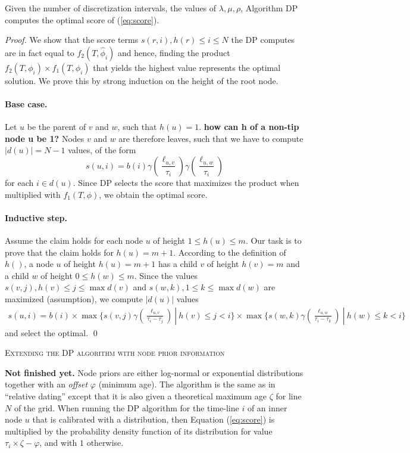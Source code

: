 \documentclass{llncs}
\renewcommand{\section}[1]{%
\bigskip
\begin{center}
\begin{Large}
\normalfont\scshape #1
\medskip
\end{Large}
\end{center}}
\begin{document}
\begin{theorem}[Optimality of DP]
Given the number of discretization intervals, the values of $\lambda,\mu,\rho$,
Algorithm DP computes the optimal score of (\ref{eq:score}).
\end{theorem}
\begin{proof}
We show that the score terms $s(r,i), h(r) \leq i \leq N$ the DP computes are
in fact equal to $f_2(T,\hat\phi_i)$ and hence, finding the product
$f_2(T,\phi_i)\times f_1(T,\phi_i)$ that yields the highest value represents the
optimal solution. We prove this by strong induction on the height of the
root node.
\paragraph{Base case.} Let $u$ be the parent of $v$ and $w$, such that $h(u) =
1$. {\bf how can h of a non-tip node u be 1?} 
Nodes $v$ and $w$ 
are therefore leaves, such that we have to compute
$|d(u)|=N-1$ values, of the form
%
%
$$
s(u,i) = b(i)
         \gamma(\frac{\ell_{u,v}}{\tau_i})
         \gamma(\frac{\ell_{u,w}}{\tau_i})
$$
%
%
for each $i \in d(u)$. Since DP selects the score that maximizes the product
when multiplied with $f_1(T,\phi)$, we obtain the optimal score.
\paragraph{Inductive step.} Assume the claim holds for each node $u$ of height
$1 \leq h(u) \leq m$. Our task is to prove that the claim holds for $h(u) =
m+1$.  According to the definition of $h()$, a node $u$ of height $h(u)=m+1$
has a child $v$ of height $h(v)=m$ and a child $w$ of height $0 \leq h(w) \leq
m$.  Since the values $s(v,j), h(v) \leq j \leq \max d(v)$ and $s(w,k), 1 \leq
k \leq \max d(w)$ are maximized (assumption), we compute $|d(u)|$ values
%
%
\begin{equation*}
\begin{split}
s(u,i) =  b(i)\times 
          \max\{ s(v,j)\gamma(\frac{\ell_{u,v}}{\tau_i-\tau_j})\ |\
              h(v) \leq j < i\} \times 
          \max\{ s(w,k)\gamma(\frac{\ell_{u,w}}{\tau_i-\tau_k})\ |\ 
               h(w) \leq k < i\}
\end{split}
\end{equation*}
%
%
and select the optimal.
\qed\end{proof}

\section{Extending the DP algorithm with node prior information}
\textbf{Not finished yet.} Node priors are either log-normal or exponential
distributions together with an {\em offset} $\varphi$ (minimum age).  The
algorithm is the same as in ``relative dating'' except that it is also given a
theoretical maximum age $\zeta$ for line $N$ of the grid.  When running the DP
algorithm for the time-line $i$ of an inner node $u$ that is calibrated with a
distribution, then Equation (\ref{eq:score}) is multiplied by the probability
density function of its distribution for value $\tau_i \times \zeta - \varphi$,
and with $1$ otherwise.
\end{document}
